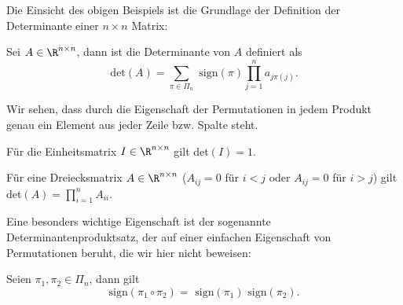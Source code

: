 \documentclass[letterpaper,10pt,english]{jupyterBook}
\begin{document}
Die Einsicht des obigen Beispiels ist die Grundlage der Definition der Determinante einer \(n \times n\) Matrix:
\label{vektorraeume/LGS:definition-12}
\begin{definition}{}{}



Sei \(A \in \R^{n \times n}\), dann ist die Determinante von \(A\) definiert als
\begin{equation*}
 \text{det}(A) = \sum_{\pi \in \Pi_n} \text{ sign}(\pi) \prod_{j=1}^n a_{j \pi(j)}.
\end{equation*}\end{definition}

Wir sehen, dass durch die Eigenschaft der Permutationen in jedem Produkt genau ein Element aus jeder Zeile bzw. Spalte steht.
\label{vektorraeume/LGS:example-13}
\begin{example}{}{}



Für die Einheitsmatrix \(I \in \R^{n \times n}\) gilt det\((I)=1\).
\end{example}
\label{vektorraeume/LGS:example-14}
\begin{example}{}{}



Für eine Dreiecksmatrix  \(A \in \R^{n \times n}\) (\(A_{ij} = 0\) für \(i< j\) oder \(A_{ij} = 0\) für \(i> j\)) gilt det\((A)=\prod_{i=1}^n A_{ii}\).
\end{example}

Eine besonders wichtige Eigenschaft ist der sogenannte Determinantenproduktsatz, der auf einer einfachen Eigenschaft von Permutationen beruht, die wir hier nicht beweisen:
\label{vektorraeume/LGS:lemma-15}
\begin{lemma}{}{}



Seien \(\pi_1, \pi_2 \in \Pi_n\), dann gilt
\begin{equation*}
  \text{sign}(\pi_1 \circ \pi_2) = \text{ sign}(\pi_1) \text{ sign}(\pi_2).
\end{equation*}\end{lemma}
\end{document}
